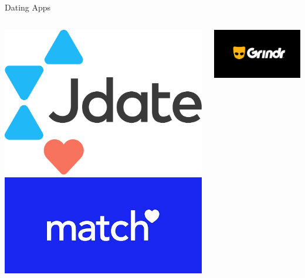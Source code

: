\documentclass[nobackground,dvipsnames,table,aspectratio=169]{beamer}
\begin{document}
\begin{frame}{Dating Apps}
    \begin{columns}
            \centering
            \begin{columns}
                    \includegraphics[width=\textwidth]{jdate}
                    \includegraphics[width=\textwidth]{match}
            \end{columns}
            \includegraphics[trim= 60 100 40 100, clip, width=\textwidth]{grindr}

\end{columns}
\end{frame}
\end{document}
